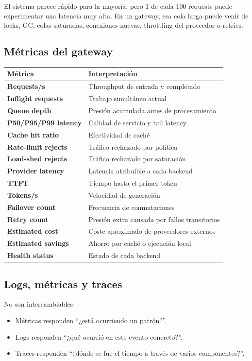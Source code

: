 \documentclass[11pt,a4paper]{article}
\begin{document}
El sistema parece rápido para la mayoría, pero 1 de cada 100 requests puede experimentar una latencia muy alta. En un gateway, esa cola larga puede venir de locks, GC, colas saturadas, conexiones nuevas, throttling del proveedor o retries.

\subsection{Métricas del gateway}

\begin{longtable}{>{\bfseries}p{4cm} p{10.5cm}}
\toprule
Métrica & Interpretación \\
\midrule
Requests/s & Throughput de entrada y completado \\
Inflight requests & Trabajo simultáneo actual \\
Queue depth & Presión acumulada antes de procesamiento \\
P50/P95/P99 latency & Calidad de servicio y tail latency \\
Cache hit ratio & Efectividad de caché \\
Rate-limit rejects & Tráfico rechazado por política \\
Load-shed rejects & Tráfico rechazado por saturación \\
Provider latency & Latencia atribuible a cada backend \\
TTFT & Tiempo hasta el primer token \\
Tokens/s & Velocidad de generación \\
Failover count & Frecuencia de conmutaciones \\
Retry count & Presión extra causada por fallos transitorios \\
Estimated cost & Coste aproximado de proveedores externos \\
Estimated savings & Ahorro por caché o ejecución local \\
Health status & Estado de cada backend \\
\bottomrule
\end{longtable}

\subsection{Logs, métricas y traces}

No son intercambiables:

\begin{itemize}
  \item Métricas responden ``¿está ocurriendo un patrón?''.
  \item Logs responden ``¿qué ocurrió en este evento concreto?''.
  \item Traces responden ``¿dónde se fue el tiempo a través de varios componentes?''.
\end{itemize}
\end{document}
